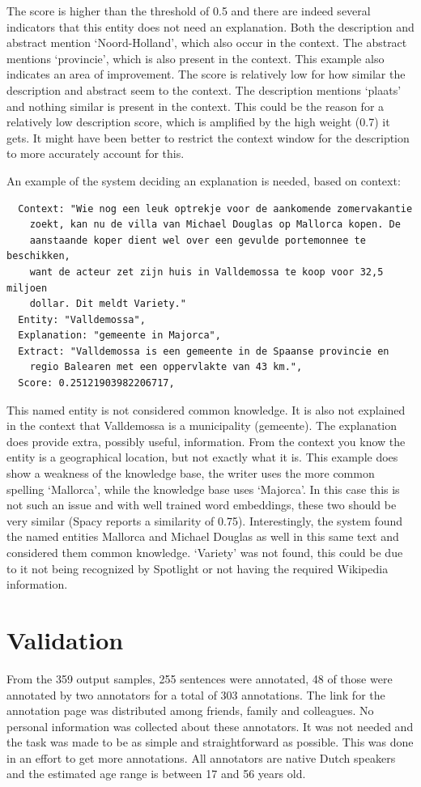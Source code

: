 \documentclass[
10pt, %
a4paper, %
oneside, %
headinclude,footinclude, %
] {book}%
\begin{document}
The score is higher than the threshold of 0.5 and there are indeed several indicators that this entity does not need an explanation.
Both the description and abstract mention `Noord-Holland', which also occur in the context.
The abstract mentions `provincie', which is also present in the context.
This example also indicates an area of improvement. 
The score is relatively low for how similar the description and abstract seem to the context.
The description mentions `plaats' and nothing similar is present in the context.
This could be the reason for a relatively low description score, which is amplified by the high weight (0.7) it gets.
It might have been better to restrict the context window for the description to more accurately account for this.

An example of the system deciding an explanation is needed, based on context:

\begin{verbatim}
  Context: "Wie nog een leuk optrekje voor de aankomende zomervakantie
    zoekt, kan nu de villa van Michael Douglas op Mallorca kopen. De
    aanstaande koper dient wel over een gevulde portemonnee te beschikken,
    want de acteur zet zijn huis in Valldemossa te koop voor 32,5 miljoen
    dollar. Dit meldt Variety."
  Entity: "Valldemossa",
  Explanation: "gemeente in Majorca",
  Extract: "Valldemossa is een gemeente in de Spaanse provincie en
    regio Balearen met een oppervlakte van 43 km.",
  Score: 0.25121903982206717,
\end{verbatim}

This named entity is not considered common knowledge. 
It is also not explained in the context that Valldemossa is a municipality (gemeente).
The explanation does provide extra, possibly useful, information.
From the context you know the entity is a geographical location, but not exactly what it is.
This example does show a weakness of the knowledge base, the writer uses the more common spelling `Mallorca', while the knowledge base uses `Majorca'.
In this case this is not such an issue and with well trained word embeddings, these two should be very similar (Spacy reports a similarity of 0.75).
Interestingly, the system found the named entities Mallorca and Michael Douglas as well in this same text and considered them common knowledge.
`Variety' was not found, this could be due to it not being recognized by Spotlight or not having the required Wikipedia information.

\section{Validation}
From the 359 output samples, 255 sentences were annotated, 48 of those were annotated by two annotators for a total of 303 annotations.
The link for the annotation page was distributed among friends, family and colleagues.
No personal information was collected about these annotators.
It was not needed and the task was made to be as simple and straightforward as possible.
This was done in an effort to get more annotations.
All annotators are native Dutch speakers and the estimated age range is between 17 and 56 years old.
\end{document}
